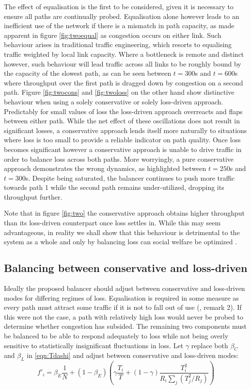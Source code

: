 The effect of equalisation is the first to be considered, given it is necessary to ensure all paths are continually probed. 
Equalisation alone however leads to an inefficient use of the network if there is a mismatch in path capacity, as made apparent in figure \ref{fig:twoequal} as congestion occurs on either link. 
Such behaviour arises in traditional traffic engineering, which resorts to equalising traffic weighted by local link capacity.  
Where a bottleneck is remote and distinct however, such behaviour will lead traffic across all links to be roughly bound by the capacity of the slowest path, as can be seen between $t=300$s and $t=600$s where throughput over the first path is dragged down by congestion on a second path.  
Figure \ref{fig:twocons} and \ref{fig:twoloss} on the other hand show distinctive behaviour when using a solely conservative or solely loss-driven approach. 
Predictably for small values of loss the loss-driven approach overreacts and flaps between either path. 
While the net effect of these oscillations does not result in significant losses, a conservative approach lends itself more naturally to situations where loss is too small to provide a reliable indicator on path quality. 
Once loss becomes significant however a conservative approach is unable to drive traffic in order to balance loss across both paths. 
More worryingly, a pure conservative approach demonstrates the wrong dynamics, as highlighted between $t=250$s and $t=300$s. 
Despite being saturated, the balancer continues to push more traffic towards path 1 while the second path remains under-utilized, dropping its throughput further.

Note that in figure \ref{fig:two} the conservative approach obtains higher throughput than its loss-driven counterpart once loss settles in. 
While this may seem advantageous, in reality we shall show that this behaviour is detrimental to the system as a whole and only by balancing loss can social welfare be optimized \cite{Kelly:2005p140}. 

\subsection{Balancing between conservative and loss-driven}

Ideally the proposed balancer should adjust between conservative and loss-driven modes for differing regimes of loss.
Equalisation is required in some measure as every path must attract some traffic if it is not to fall out of use (\cite{Kelly:2005p140}, remark 2). 
If this were not the case, a path with relatively high loss would never be probed to determine whether congestion has subsided.
The remaining two components must be balanced to be able to respond adequately to loss while not being overly sensitive to statistically insignificant fluctuations in loss. 
Let $\gamma$ replace both $\beta_C$ and $\beta_L$ in \eqref{eqn:Tdashi} and adjust between conservative and loss-driven modes:
\begin{equation}
f'_i = \beta_E \frac{1}{N} + \left( 1-\beta_E \right) \left(
\gamma \frac{T_i}{T} + \left(1-\gamma\right) \frac{T_i^2}{R_i \sum_j
(T_j^2/R_j)} \right)
\label{eqn:gamma}
\end{equation}

